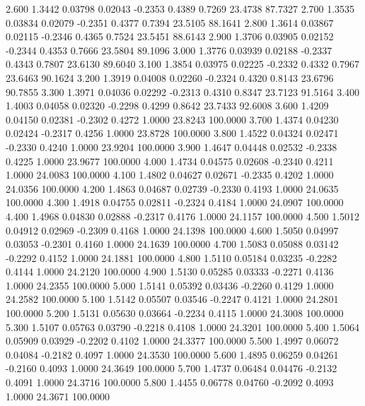    2.600   1.3442   0.03798   0.02043  -0.2353   0.4389   0.7269  23.4738  87.7327
   2.700   1.3535   0.03834   0.02079  -0.2351   0.4377   0.7394  23.5105  88.1641
   2.800   1.3614   0.03867   0.02115  -0.2346   0.4365   0.7524  23.5451  88.6143
   2.900   1.3706   0.03905   0.02152  -0.2344   0.4353   0.7666  23.5804  89.1096
   3.000   1.3776   0.03939   0.02188  -0.2337   0.4343   0.7807  23.6130  89.6040
   3.100   1.3854   0.03975   0.02225  -0.2332   0.4332   0.7967  23.6463  90.1624
   3.200   1.3919   0.04008   0.02260  -0.2324   0.4320   0.8143  23.6796  90.7855
   3.300   1.3971   0.04036   0.02292  -0.2313   0.4310   0.8347  23.7123  91.5164
   3.400   1.4003   0.04058   0.02320  -0.2298   0.4299   0.8642  23.7433  92.6008
   3.600   1.4209   0.04150   0.02381  -0.2302   0.4272   1.0000  23.8243 100.0000
   3.700   1.4374   0.04230   0.02424  -0.2317   0.4256   1.0000  23.8728 100.0000
   3.800   1.4522   0.04324   0.02471  -0.2330   0.4240   1.0000  23.9204 100.0000
   3.900   1.4647   0.04448   0.02532  -0.2338   0.4225   1.0000  23.9677 100.0000
   4.000   1.4734   0.04575   0.02608  -0.2340   0.4211   1.0000  24.0083 100.0000
   4.100   1.4802   0.04627   0.02671  -0.2335   0.4202   1.0000  24.0356 100.0000
   4.200   1.4863   0.04687   0.02739  -0.2330   0.4193   1.0000  24.0635 100.0000
   4.300   1.4918   0.04755   0.02811  -0.2324   0.4184   1.0000  24.0907 100.0000
   4.400   1.4968   0.04830   0.02888  -0.2317   0.4176   1.0000  24.1157 100.0000
   4.500   1.5012   0.04912   0.02969  -0.2309   0.4168   1.0000  24.1398 100.0000
   4.600   1.5050   0.04997   0.03053  -0.2301   0.4160   1.0000  24.1639 100.0000
   4.700   1.5083   0.05088   0.03142  -0.2292   0.4152   1.0000  24.1881 100.0000
   4.800   1.5110   0.05184   0.03235  -0.2282   0.4144   1.0000  24.2120 100.0000
   4.900   1.5130   0.05285   0.03333  -0.2271   0.4136   1.0000  24.2355 100.0000
   5.000   1.5141   0.05392   0.03436  -0.2260   0.4129   1.0000  24.2582 100.0000
   5.100   1.5142   0.05507   0.03546  -0.2247   0.4121   1.0000  24.2801 100.0000
   5.200   1.5131   0.05630   0.03664  -0.2234   0.4115   1.0000  24.3008 100.0000
   5.300   1.5107   0.05763   0.03790  -0.2218   0.4108   1.0000  24.3201 100.0000
   5.400   1.5064   0.05909   0.03929  -0.2202   0.4102   1.0000  24.3377 100.0000
   5.500   1.4997   0.06072   0.04084  -0.2182   0.4097   1.0000  24.3530 100.0000
   5.600   1.4895   0.06259   0.04261  -0.2160   0.4093   1.0000  24.3649 100.0000
   5.700   1.4737   0.06484   0.04476  -0.2132   0.4091   1.0000  24.3716 100.0000
   5.800   1.4455   0.06778   0.04760  -0.2092   0.4093   1.0000  24.3671 100.0000
